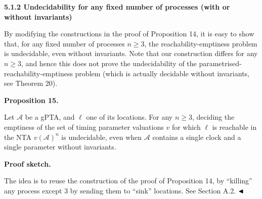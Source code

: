 \documentclass[10pt,a4paper]{article}
\begin{document}
 
 
 
\par\medskip\noindent\textbf{5.1.2 Undecidability for any fixed number of processes (with or without invariants)}\par
 
 
By modifying the constructions in the proof of Proposition 14, it is easy to show that, for any fixed number of processes $n\geq 3$, the reachability-emptiness problem is undecidable, even without invariants. Note that our construction differs for any $n\geq 3$, and hence this does not prove the undecidability of the parametrised-reachability-emptiness problem (which is actually decidable without invariants, see Theorem 20).\par
 
 
 
\par\medskip\noindent\textbf{Proposition 15.}\par
 
 
Let $\mathcal{A}$ be a gPTA, and $\mathrm{\ell}$ one of its locations. For any $n\geq 3$, deciding the emptiness of the set of timing parameter valuations $v$ for which $\mathrm{\ell}$ is reachable in the NTA ${v(\mathcal{A})}^{n}$ is undecidable, even when $\mathcal{A}$ contains a single clock and a single parameter without invariants.\par
 
 
 
 
\par\medskip\noindent\textbf{Proof sketch.}\par
 
 
The idea is to reuse the construction of the proof of Proposition 14, by “killing” any process except 3 by sending them to “sink” locations. See Section A.2. $\hfill\blacktriangleleft$\par
 
 
 
\end{document}
